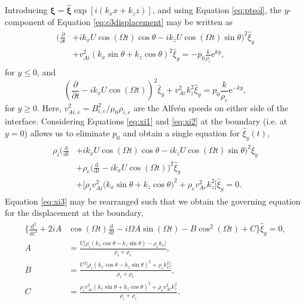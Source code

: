 \documentclass[12pt]{ociamthesis}
\begin{document}
Introducing $\bm \xi = \hat{\bm \xi} \exp[i (k_x x + k_z z)]$, and using Equation \eqref{eq:ptsol}, the $y$-component of Equation \eqref{eq:c3displacement} may be written as
%
\begin{align}
\begin{split}
\label{eq:xi1}
\bigg( \frac{\partial}{\partial t}
& + i k_x U \cos(\Omega t) \cos\theta
- i k_z U \cos(\Omega t) \sin\theta \bigg)^2 \hat \xi_y
\\
& + v_{A i}^2 \left( k_x \sin\theta
+ k_z \cos\theta \right)^2 \hat \xi_y
= - p_0 \frac{k}{\rho_i} \mathrm{e}^{k y},
\end{split}
\end{align}
%
for $y \leq 0$, and
%
\begin{equation}
\label{eq:xi2}
\left( \frac{\partial}{\partial t}
- i k_x U \cos(\Omega t) \right)^2 \hat \xi_y
+ v_{A e}^2 k_z^2 \hat \xi_y
= p_0 \frac{k}{\rho_e} \mathrm{e}^{- k y},
\end{equation}
%
for $y \geq 0$.
Here, $v_{Ai, e}^2 = B_{i, e}^2 / \mu_0\rho_{i, e}$ are the Alfv\'en speeds on either side of the interface.
Considering Equations \eqref{eq:xi1} and \eqref{eq:xi2} at the boundary (i.e. at $y=0$) allows us to eliminate $p_0$ and obtain a single equation for $\hat \xi_y (t)$,
%
\begin{align}
\begin{split}
\label{eq:xi3}
\rho_i \bigg( \frac{\mathrm{d}}{\mathrm{d} t}
& + i k_x U \cos(\Omega t) \cos\theta
- i k_z U \cos(\Omega t) \sin\theta \bigg)^2 \hat \xi_y
\\
& + \rho_e \bigg( \frac{\mathrm{d}}{\mathrm{d} t}
- i k_x U \cos(\Omega t) \bigg)^2 \hat \xi_y
\\[0.1cm]
& + \big[ \rho_i v_{A i}^2 \big( k_x \sin\theta
+ k_z \cos\theta \big)^2
+ \rho_e v_{A e}^2 k_z^2 \big] \hat \xi_y
= 0.
\end{split}
\end{align}
%
Equation \eqref{eq:xi3} may be rearranged such that we obtain the governing equation for the displacement at the boundary,
%
\begin{align}
\begin{split}
\label{eq:c3goveq}
\bigg\{ \frac{\mathrm{d}^2}{\mathrm{d} t^2}
+ 2 i A & \cos(\Omega t) \frac{\mathrm{d}}{\mathrm{d} t}
- i \Omega A \sin(\Omega t)
- B \cos^2(\Omega t) 
+ C \bigg\} \hat \xi_y
= 0,
\\[0.1cm]
A
& = \frac{U \big[ \rho_i ( k_x \cos\theta - k_z \sin\theta ) 
- \rho_e k_x \big]}{\rho_i + \rho_e},
\\[0.1cm]
B
& = \frac{U^2 \big[ \rho_i \left( k_x \cos\theta
- k_z \sin\theta \right)^2
+ \rho_e k_x^2 \big]}{\rho_i + \rho_e},
\\[0.1cm]
C
& = \frac{\rho_i v_{A i}^2 \left( k_x \sin\theta
+ k_z \cos\theta \right)^2
+ \rho_e v_{A e}^2 k_z^2}{\rho_i + \rho_e}.
\end{split}
\end{align}
\end{document}
